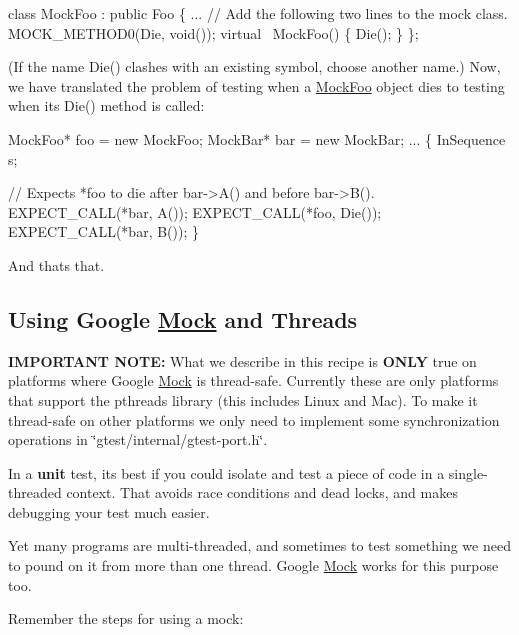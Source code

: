 \begin{DoxyCode}
\textcolor{keyword}{class }MockFoo : \textcolor{keyword}{public} Foo \{
  ...
  \textcolor{comment}{// Add the following two lines to the mock class.}
  MOCK\_METHOD0(Die, \textcolor{keywordtype}{void}());
  \textcolor{keyword}{virtual} ~MockFoo() \{ Die(); \}
\};
\end{DoxyCode}


(If the name {\ttfamily Die()} clashes with an existing symbol, choose another name.) Now, we have translated the problem of testing when a {\ttfamily \hyperlink{classMockFoo}{Mock\+Foo}} object dies to testing when its {\ttfamily Die()} method is called\+:


\begin{DoxyCode}
MockFoo* foo = \textcolor{keyword}{new} MockFoo;
MockBar* bar = \textcolor{keyword}{new} MockBar;
...
\{
  InSequence s;

  \textcolor{comment}{// Expects *foo to die after bar->A() and before bar->B().}
  EXPECT\_CALL(*bar, A());
  EXPECT\_CALL(*foo, Die());
  EXPECT\_CALL(*bar, B());
\}
\end{DoxyCode}


And that\textquotesingle{}s that.

\subsection*{Using Google \hyperlink{classMock}{Mock} and Threads}

{\bfseries I\+M\+P\+O\+R\+T\+A\+NT N\+O\+TE\+:} What we describe in this recipe is {\bfseries O\+N\+LY} true on platforms where Google \hyperlink{classMock}{Mock} is thread-\/safe. Currently these are only platforms that support the pthreads library (this includes Linux and Mac). To make it thread-\/safe on other platforms we only need to implement some synchronization operations in {\ttfamily \char`\"{}gtest/internal/gtest-\/port.\+h\char`\"{}}.

In a {\bfseries unit} test, it\textquotesingle{}s best if you could isolate and test a piece of code in a single-\/threaded context. That avoids race conditions and dead locks, and makes debugging your test much easier.

Yet many programs are multi-\/threaded, and sometimes to test something we need to pound on it from more than one thread. Google \hyperlink{classMock}{Mock} works for this purpose too.

Remember the steps for using a mock\+:


